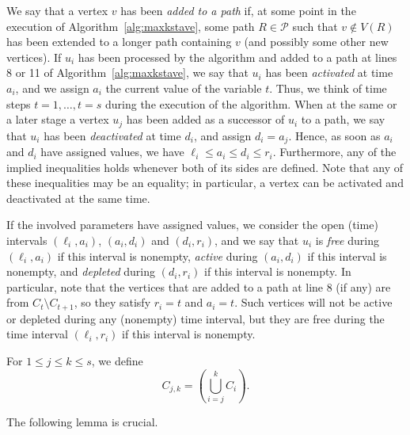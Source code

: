 \documentclass{llncs}
\newcommand{\cP}{{\mathcal P}}
\begin{document}
We say that a vertex $v$ has been {\em added to a path\/} if, at some point in the execution of Algorithm~\ref{alg:maxkstave}, some path $R\in\cP$ such that $v\notin V(R)$ has been extended to a longer path containing $v$ (and possibly some other new vertices). If $u_i$ has been processed by the algorithm and added to a path at lines 8 or 
11 of Algorithm~\ref{alg:maxkstave}, we 
say that $u_i$ has been \emph{activated} at time $a_i$, and we assign $a_i$ the current value of the variable $t$. Thus, we think of time steps $t=1,\ldots,t=s$ during the execution of the algorithm. 
When 
at the same or a later stage a vertex $u_j$ has been added as a successor of $u_i$ to a path,
we say that $u_i$ has been \emph{deactivated} at time $d_i$, and assign $d_i=a_j$. 
Hence, as soon as $a_i$ and $d_i$ have assigned values, we have $\ell_i\le a_i\le d_i\le r_i$. Furthermore, any of the implied inequalities holds whenever both of its sides are defined.
Note that any of these inequalities may be an equality; in particular, a vertex can be activated and deactivated at the same time.

If the involved parameters have assigned values, we consider
the open (time) intervals $(\ell_i,a_i)$, $(a_i,d_i)$ and $(d_i,r_i)$, and we
say that $u_i$ is \emph{free} during $(\ell_i,a_i)$ if this interval is nonempty, \emph{active} during $(a_i,d_i)$ if this interval is nonempty, and \emph{depleted} during $(d_i,r_i)$ if this interval is nonempty.
In particular, note that the vertices that are added to a path at line 8 (if any) are from
$C_t\setminus C_{t+1}$, so they satisfy $r_i=t$ and $a_i=t$. Such vertices will not be
active or depleted during any (nonempty) time interval, but they are free during the time interval $(\ell_i,r_i)$ if this interval is nonempty.

For $1\leq j \leq k \leq s$, we define
\begin{equation*}
  C_{j,k} = (\bigcup_{i=j}^kC_i).
\end{equation*}

The following lemma is crucial.
\end{document}
